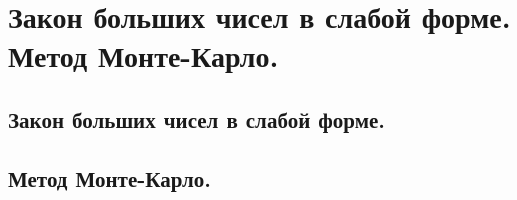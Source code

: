 \section{Закон больших чисел в слабой форме. Метод Монте-Карло.}

\subsection{Закон больших чисел в слабой форме.}

\subsection{Метод Монте-Карло.}